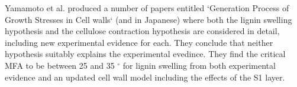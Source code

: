 Yamamoto et al. produced a number of papers entitled `Generation Process of
Growth Stresses in Cell walls` \cite{ISI:A1991FD97000001}\cite{ISI:A1992HP18200001}\cite{ISI:A1993LM28800002}\cite{ISI:A1993LE99600003}\cite{ISI:A1995QJ03000001} (and \cite{ISI:A1988R357800002}\cite{ISI:A1990EL71100002} in Japanese) where both the lignin swelling
hypothesis and the cellulose contraction hypothesis are considered in detail,
including new experimental evidence for each. They conclude that neither hypothesis suitably explains the experimental evedince. They find the critical MFA to be between 25 and 35 $^{\circ}$ for lignin swelling from both experimental evidence and an updated cell wall model including the effects of the S1 layer. 